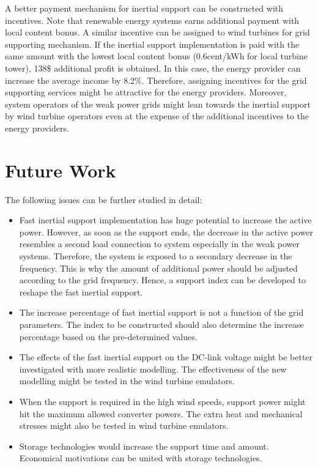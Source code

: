 A better payment mechanism for inertial support can be constructed with incentives. Note that renewable energy systems earns additional payment with local content bonus. A similar incentive can be assigned to wind turbines for grid supporting mechanism. If the inertial support implementation is paid with the same amount with the lowest local content bonus (0.6cent/kWh for local turbine tower), 138\$ additional profit is obtained. In this case, the energy provider can increase the average income by 8.2\%. Therefore, assigning incentives for the grid supporting services might be attractive for the energy providers. Moreover, system operators of the weak power grids might lean towards the inertial support by wind turbine operators even at the expense of the additional incentives to the energy providers.
\section{Future Work}
The following issues can be further studied in detail:
\begin{itemize}
	\item Fast inertial support implementation has huge potential to increase the active power. However, as soon as the support ends, the decrease in the active power resembles a second load connection to system especially in the weak power systems. Therefore, the system is exposed to a secondary decrease in the frequency. This is why the amount of additional power should be adjusted according to the grid frequency. Hence, a support index can be developed to reshape the fast inertial support. 
	\item The increase percentage of fast inertial support is not a function of the grid parameters. The index to be constructed should also determine the increase percentage based on the pre-determined values. 
	\item The effects of the fast inertial support on the DC-link voltage might be better investigated with more realistic modelling. The effectiveness of the new modelling might be tested in the wind turbine emulators. 
	\item When the support is required in the high wind speeds, support power might hit the maximum allowed converter powers. The extra heat and mechanical stresses might also be tested in wind turbine emulators. 
	\item Storage technologies would increase the support time and amount. Economical motivations can be united with storage technologies.
\end{itemize}